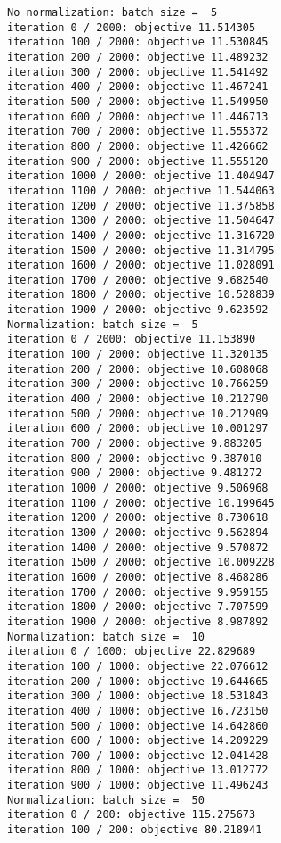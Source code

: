\documentclass[11pt]{article}
\begin{document}
    \begin{Verbatim}[commandchars=\\\{\}]
No normalization: batch size =  5
iteration 0 / 2000: objective 11.514305
iteration 100 / 2000: objective 11.530845
iteration 200 / 2000: objective 11.489232
iteration 300 / 2000: objective 11.541492
iteration 400 / 2000: objective 11.467241
iteration 500 / 2000: objective 11.549950
iteration 600 / 2000: objective 11.446713
iteration 700 / 2000: objective 11.555372
iteration 800 / 2000: objective 11.426662
iteration 900 / 2000: objective 11.555120
iteration 1000 / 2000: objective 11.404947
iteration 1100 / 2000: objective 11.544063
iteration 1200 / 2000: objective 11.375858
iteration 1300 / 2000: objective 11.504647
iteration 1400 / 2000: objective 11.316720
iteration 1500 / 2000: objective 11.314795
iteration 1600 / 2000: objective 11.028091
iteration 1700 / 2000: objective 9.682540
iteration 1800 / 2000: objective 10.528839
iteration 1900 / 2000: objective 9.623592
Normalization: batch size =  5
iteration 0 / 2000: objective 11.153890
iteration 100 / 2000: objective 11.320135
iteration 200 / 2000: objective 10.608068
iteration 300 / 2000: objective 10.766259
iteration 400 / 2000: objective 10.212790
iteration 500 / 2000: objective 10.212909
iteration 600 / 2000: objective 10.001297
iteration 700 / 2000: objective 9.883205
iteration 800 / 2000: objective 9.387010
iteration 900 / 2000: objective 9.481272
iteration 1000 / 2000: objective 9.506968
iteration 1100 / 2000: objective 10.199645
iteration 1200 / 2000: objective 8.730618
iteration 1300 / 2000: objective 9.562894
iteration 1400 / 2000: objective 9.570872
iteration 1500 / 2000: objective 10.009228
iteration 1600 / 2000: objective 8.468286
iteration 1700 / 2000: objective 9.959155
iteration 1800 / 2000: objective 7.707599
iteration 1900 / 2000: objective 8.987892
Normalization: batch size =  10
iteration 0 / 1000: objective 22.829689
iteration 100 / 1000: objective 22.076612
iteration 200 / 1000: objective 19.644665
iteration 300 / 1000: objective 18.531843
iteration 400 / 1000: objective 16.723150
iteration 500 / 1000: objective 14.642860
iteration 600 / 1000: objective 14.209229
iteration 700 / 1000: objective 12.041428
iteration 800 / 1000: objective 13.012772
iteration 900 / 1000: objective 11.496243
Normalization: batch size =  50
iteration 0 / 200: objective 115.275673
iteration 100 / 200: objective 80.218941

    \end{Verbatim}
\end{document}
